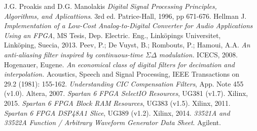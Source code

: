 \documentclass[a4paper,conference]{IEEEtran}
\begin{document}











%
%
%
\begin{thebibliography}{1}

J.G. Proakis and D.G. Manolakis \emph{Digital Signal Processing Principles, Algorithms, and Aplicattions}. 3rd ed. Patrice-Hall, 1996, pp 671-676.
Hellman J. \emph{Implementation of a Low-Cost Analog-to-Digital Converter for Audio Applications Using an FPGA}, MS Tesis, Dep. Electric. Eng., Linköpings Universitet, Linköping, Suecia, 2013.
Peev, P.; De Vuyst, B.; Rombouts, P.; Hamoui, A.A. \emph{An anti-aliasing filter inspired by continuous-time $\Sigma\Delta$ modulation.} ICECS, 2008.
	Hogenauer, Eugene. \emph{An economical class of digital filters for decimation and interpolation.} Acoustics, Speech and Signal Processing, IEEE Transactions on 29.2 (1981): 155-162.
	\emph{Understanding CIC Compensation Filters}, App. Note 455 (v1.0). Altera, 2007.
	\emph{Spartan 6 FPGA SelectIO Resources}, UG381 (v1.7). Xilinx, 2015.
	\emph{Spartan 6 FPGA Block RAM Resources}, UG383 (v1.5). Xilinx, 2011.
	\emph{Spartan 6 FPGA DSP48A1 Slice}, UG389 (v1.2). Xilinx, 2014.
	\emph{33521A and 33522A Function / Arbitrary Waveform Generator Data Sheet}. Agilent. 
\end{thebibliography}




\end{document}
